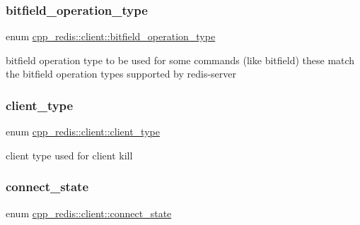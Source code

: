 \subsubsection{\texorpdfstring{bitfield\+\_\+operation\+\_\+type}{bitfield\_operation\_type}}
{\footnotesize\ttfamily enum \mbox{\hyperlink{classcpp__redis_1_1client_a2e2023534299541da0a659802e2f087d}{cpp\+\_\+redis\+::client\+::bitfield\+\_\+operation\+\_\+type}}\hspace{0.3cm}{\ttfamily [strong]}}

bitfield operation type to be used for some commands (like bitfield) these match the bitfield operation types supported by redis-\/server \mbox{\label{classcpp__redis_1_1client_a388877b01b4e045cddb138e70a68e000}} 
\subsubsection{\texorpdfstring{client\+\_\+type}{client\_type}}
{\footnotesize\ttfamily enum \mbox{\hyperlink{classcpp__redis_1_1client_a388877b01b4e045cddb138e70a68e000}{cpp\+\_\+redis\+::client\+::client\+\_\+type}}\hspace{0.3cm}{\ttfamily [strong]}}

client type used for client kill \mbox{\label{classcpp__redis_1_1client_a2512bd48dd45391249a69bd720c1e4da}} 
\subsubsection{\texorpdfstring{connect\+\_\+state}{connect\_state}}
{\footnotesize\ttfamily enum \mbox{\hyperlink{classcpp__redis_1_1client_a2512bd48dd45391249a69bd720c1e4da}{cpp\+\_\+redis\+::client\+::connect\+\_\+state}}\hspace{0.3cm}{\ttfamily [strong]}}


